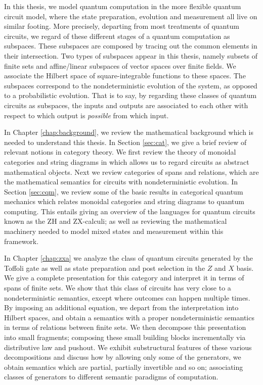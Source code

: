 \documentclass[12pt]{ociamthesis}  %
\begin{document}
In this thesis, we model quantum computation in the more flexible quantum circuit model, where the state preparation, evolution and measurement all live on similar footing.  More precisely, departing from most treatments of quantum circuits, we regard of these different stages of a quantum computation as subspaces. These subspaces are composed by tracing out the common elements in their intersection.  Two types of subspaces appear in this thesis, namely subsets of finite sets and affine/linear subspaces of vector spaces over finite fields.  We associate the Hilbert space of square-integrable functions to these spaces. The subspaces correspond to the nondeterministic evolution of the system, as opposed to a probabilistic evolution.  That is to say, by regarding these classes of quantum circuits as subspaces, the inputs and outputs are associated to each other with respect to which output is {\em possible} from which input.

In Chapter \ref{chap:background}, we review the mathematical background which is needed to understand this thesis.  In Section \ref{sec:cat}, we give a brief review of relevant notions in category theory.  We first review the theory of monoidal categories and string diagrams in which allows us to regard circuits as abstract mathematical objects.  Next we review categories of spans and relations, which are the mathematical semantics for circuits with nondeterministic evolution.  In Section \ref{sec:cqm}, we review some of the basic results in categorical quantum mechanics which relates monoidal categories and string diagrams to quantum computing. This entails giving an overview of the languages for quantum circuits known as the  ZH and ZX-calculi; as well as reviewing the mathematical machinery needed to model mixed states and measurement within this framework.

In Chapter \ref{chap:zxa} we analyze the class of quantum circuits generated by the Toffoli gate as well as state preparation and post selection in the $Z$ and $X$ basis.  We give a complete presentation for this category and interpret it in terms of spans of finite sets.  We show that this class of circuits has very close to a nondeterministic semantics, except where outcomes can happen multiple times.  By imposing an additional equation, we depart from the interpretation into Hilbert spaces, and obtain a semantics with a proper  nondeterministic semantics in terms of relations between finite sets. We then decompose this presentation into small fragments; composing these small building blocks incrementally via distributive law and pushout.
We exhibit substructural features of these various decompositions and discuss how by allowing only some of the generators, we obtain semantics which are partial, partially invertible and so on; associating classes of generators to different semantic paradigms of computation.
\end{document}
